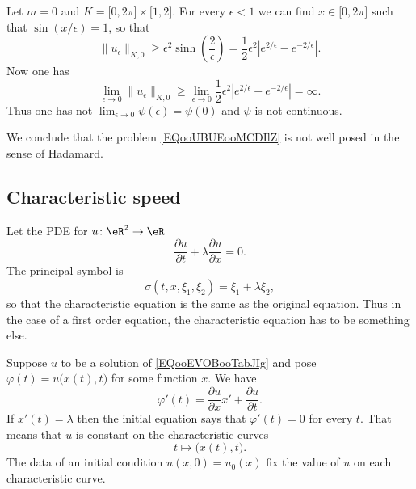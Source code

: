 \begin{example}
	Let \( m=0\) and \( K=\mathopen[ 0 , 2\pi \mathclose]\times\mathopen[ 1 , 2 \mathclose]\). For every \( \epsilon<1\) we can find \( x\in\mathopen[ 0 , 2\pi \mathclose]\) such that \( \sin(x/\epsilon)=1\), so that
	\begin{equation}
		\| u_{\epsilon} \|_{K,0}\geq \epsilon^2\sinh\left( \frac{ 2 }{ \epsilon } \right)=\frac{ 1 }{2}\epsilon^2|  e^{2/\epsilon}- e^{-2/\epsilon} |.
	\end{equation}
	Now one has
	\begin{equation}
		\lim_{\epsilon\to 0}\| u_{\epsilon} \|_{K,0}\geq \lim_{\epsilon\to 0}\frac{ 1 }{2}\epsilon^2|  e^{2/\epsilon}- e^{-2/\epsilon} |=\infty.
	\end{equation}
	Thus one has not \( \lim_{\epsilon\to 0}\psi(\epsilon)=\psi(0)\) and \( \psi\) is not continuous.

	We conclude that the problem \eqref{EQooUBUEooMCDIlZ} is not well posed in the sense of Hadamard.
\end{example}

\subsection{Characteristic speed}

Let the PDE for \( u\colon \eR^2\to \eR\)
\begin{equation}        \label{EQooEVOBooTabJIg}
	\frac{ \partial u }{ \partial t }+\lambda\frac{ \partial u }{ \partial x }=0.
\end{equation}
The principal symbol is
\begin{equation}
	\sigma(t,x,\xi_1,\xi_2)=\xi_1+\lambda \xi_2,
\end{equation}
so that the characteristic equation is the same as the original equation. Thus in the case of a first order equation, the characteristic equation has to be something else.

Suppose \( u\) to be a solution of \eqref{EQooEVOBooTabJIg} and pose \( \varphi(t)=u\big( x(t),t \big)\) for some function \( x\). We have
\begin{equation}
	\varphi'(t)=\frac{ \partial u }{ \partial x }x'+\frac{ \partial u }{ \partial t }.
\end{equation}
If \( x'(t)=\lambda\) then the initial equation says that \( \varphi'(t)=0\) for every \( t\). That means that \( u\) is constant on the characteristic curves
\begin{equation}
	t\mapsto \big( x(t),t \big).
\end{equation}
The data of an initial condition \( u(x,0)=u_0(x)\) fix the value of \( u\) on each characteristic curve.

